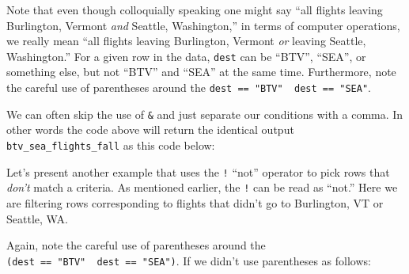 \documentclass[12pt, krantz2,]{krantz}
\makeatletter
\newenvironment{Shaded}{\begin{snugshade}}{\end{snugshade}}
\newcommand{\DecValTok}[1]{\textcolor[rgb]{0.06,0.06,0.06}{#1}}
\newcommand{\KeywordTok}[1]{\textcolor[rgb]{0.27,0.27,0.27}{\textbf{#1}}}
\newcommand{\NormalTok}[1]{#1}
\newcommand{\OperatorTok}[1]{\textcolor[rgb]{0.43,0.43,0.43}{\textbf{#1}}}
\newcommand{\StringTok}[1]{\textcolor[rgb]{0.5,0.5,0.5}{#1}}
\newenvironment{kframe}{%
\medskip{}
\setlength{\fboxsep}{.8em}
 \def\at@end@of@kframe{}%
 \ifinner\ifhmode%
  \def\at@end@of@kframe{\end{minipage}}%
  \begin{minipage}{\columnwidth}%
 \fi\fi%
 \def\FrameCommand##1{\hskip\@totalleftmargin \hskip-\fboxsep
 \colorbox{shadecolor}{##1}\hskip-\fboxsep
     \hskip-\linewidth \hskip-\@totalleftmargin \hskip\columnwidth}%
 \MakeFramed {\advance\hsize-\width
   \@totalleftmargin\z@ \linewidth\hsize
   \@setminipage}}%
 {\par\unskip\endMakeFramed%
 \at@end@of@kframe}
\renewenvironment{Shaded}{\begin{kframe}}{\end{kframe}}
\makeatother
\begin{document}
Note that even though colloquially speaking one might say ``all flights leaving Burlington, Vermont \emph{and} Seattle, Washington,'' in terms of computer operations, we really mean ``all flights leaving Burlington, Vermont \emph{or} leaving Seattle, Washington.'' For a given row in the data, \texttt{dest} can be ``BTV'', ``SEA'', or something else, but not ``BTV'' and ``SEA'' at the same time. Furthermore, note the careful use of parentheses around the \texttt{dest\ ==\ "BTV"\ \textbar{}\ dest\ ==\ "SEA"}.

We can often skip the use of \texttt{\&} and just separate our conditions with a comma. In other words the code above will return the identical output \texttt{btv\_sea\_flights\_fall} as this code below:

\begin{Shaded}
\end{Shaded}

Let's present another example that uses the \texttt{!} ``not'' operator to pick rows that \emph{don't} match a criteria. As mentioned earlier, the \texttt{!} can be read as ``not.'' Here we are filtering rows corresponding to flights that didn't go to Burlington, VT or Seattle, WA.

\begin{Shaded}
\end{Shaded}

Again, note the careful use of parentheses around the \texttt{(dest\ ==\ "BTV"\ \textbar{}\ dest\ ==\ "SEA")}. If we didn't use parentheses as follows:
\end{document}
